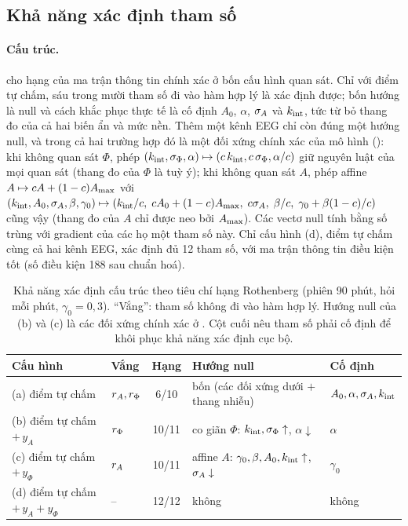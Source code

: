 \subsection{Khả năng xác định tham số}
\label{sec:res-ident}

\paragraph{Cấu trúc.}  cho hạng của ma trận thông tin chính xác ở bốn cấu hình quan sát. Chỉ với điểm tự chấm, sáu trong mười tham số đi vào hàm hợp lý là xác định được; bốn hướng là null và cách khắc phục thực tế là cố định $A_0$, $\alpha$, $\sigma_{A}$ và $k_{\mathrm{int}}$, tức từ bỏ thang đo của cả hai biến ẩn và mức nền. Thêm một kênh EEG chỉ còn đúng một hướng null, và trong cả hai trường hợp đó là một đối xứng chính xác của mô hình (): khi không quan sát $\Phi$, phép $(k_{\mathrm{int}},\sigma_{\Phi},\alpha)\mapsto(c\,k_{\mathrm{int}},c\,\sigma_{\Phi},\alpha/c)$ giữ nguyên luật của mọi quan sát (thang đo của $\Phi$ là tuỳ ý); khi không quan sát $A$, phép affine $A\mapsto cA+(1-c)A_{\max}$ với $(k_{\mathrm{int}},A_0,\sigma_{A},\beta,\gamma_0)\mapsto(k_{\mathrm{int}}/c,\;cA_0+(1-c)A_{\max},\;c\sigma_{A},\;\beta/c,\;\gamma_0+\beta(1-c)/c)$ cũng vậy (thang đo của $A$ chỉ được neo bởi $A_{\max}$). Các vectơ null tính bằng số trùng với gradient của các họ một tham số này. Chỉ cấu hình (d), điểm tự chấm cùng cả hai kênh EEG, xác định đủ 12 tham số, với ma trận thông tin điều kiện tốt (số điều kiện 188 sau chuẩn hoá).

\begin{table}[t]
\centering\small
\caption{Khả năng xác định cấu trúc theo tiêu chí hạng Rothenberg (phiên 90 phút, hỏi mỗi phút, $\gamma_0=0{,}3$). ``Vắng'': tham số không đi vào hàm hợp lý. Hướng null của (b) và (c) là các đối xứng chính xác ở . Cột cuối nêu tham số phải cố định để khôi phục khả năng xác định cục bộ.}
\label{tab:structural}
\footnotesize\setlength{\tabcolsep}{3pt}
\begin{tabular}{llcll}
\toprule
Cấu hình & Vắng & Hạng & Hướng null & Cố định \\
\midrule
(a) điểm tự chấm                 & $r_{A},r_{\Phi}$ & 6/10  & bốn (các đối xứng dưới $+$ thang nhiễu) & $A_0,\alpha,\sigma_{A},k_{\mathrm{int}}$ \\
(b) điểm tự chấm $+\,y_A$        & $r_{\Phi}$     & 10/11 & co giãn $\Phi$: $k_{\mathrm{int}},\sigma_{\Phi}\uparrow$, $\alpha\downarrow$ & $\alpha$ \\
(c) điểm tự chấm $+\,y_\Phi$     & $r_{A}$       & 10/11 & affine $A$: $\gamma_0,\beta,A_0,k_{\mathrm{int}}\uparrow$, $\sigma_{A}\downarrow$ & $\gamma_0$ \\
(d) điểm tự chấm $+\,y_A+y_\Phi$ & --          & 12/12 & không & không \\
\bottomrule
\end{tabular}
\end{table}

